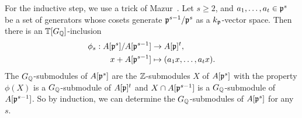 \documentclass{article}
\begin{document}
For the inductive step, we use a trick of Mazur~\cite[pg.
112]{mazur:eisenstein}. Let $s\geq 2$, and
$a_1,\ldots,a_t\in \mathfrak{p}^s$ be a set of generators whose cosets generate
$\mathfrak{p}^{s-1}/\mathfrak{p}^s$ as a $k_{\mathfrak{p}}$-vector space. Then there is an $\mathbb{T}[G_{\mathbb{Q}}]$-inclusion
\begin{align*}
    \phi_s: A[\mathfrak{p}^s]/A[\mathfrak{p}^{s-1}] & \to A[\mathfrak{p}]^t, \\
    x+A[\mathfrak{p}^{s-1}] & \mapsto (a_1x,\ldots,a_tx).
\end{align*}
The $G_{\mathbb{Q}}$-submodules of $A[\mathfrak{p}^s]$ are the $\mathbb{Z}$-submodules $X$ of $A[\mathfrak{p}^s]$ with
the property $\phi(X)$ is a $G_{\mathbb{Q}}$-submodule of $A[\mathfrak{p}]^t$ and $X\cap A[\mathfrak{p}^{s-1}]$
is a $G_{\mathbb{Q}}$-submodule of $A[\mathfrak{p}^{s-1}]$. So by induction, we can determine the
$G_{\mathbb{Q}}$-submodules of $A[\mathfrak{p}^s]$ for any $s$. 



\end{document}
